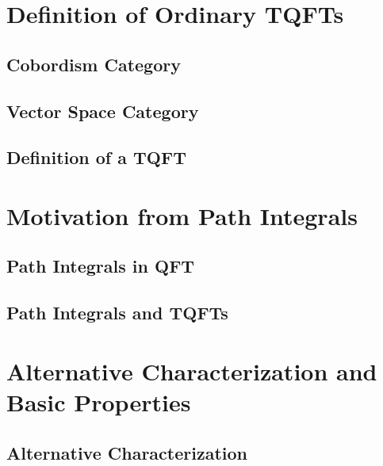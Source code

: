 \documentclass[a4paper,11pt,psamsfonts,reqno]{amsbook}
\newcounter{prpcounter}
\theoremstyle{proposition}
\theoremstyle{proof}
\begin{document}
\chapter{Definition of Ordinary TQFTs}
\label{chap:defordtqft}



\section{Cobordism Category}
\label{sec:cob}



\section{Vector Space Category}
\label{sec:vec}



\section{Definition of a TQFT}
\label{sec:deftqft}




\chapter{Motivation from Path Integrals}
\label{chap:motpathint}



\section{Path Integrals in QFT}
\label{sec:piform}



\section{Path Integrals and TQFTs}
\label{sec:pitqfts}




\chapter{Alternative Characterization and Basic Properties}
\label{CHAP:ALTCHARPROPS}



\section{Alternative Characterization}
\label{sec:altchar}

\end{document}

